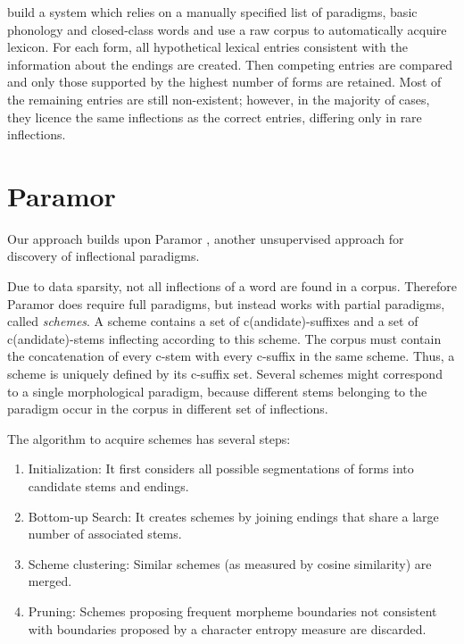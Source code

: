 \documentclass[11pt]{article}
\begin{document}
\cite{hana-etal-2004-emnlp,feldman-hana-2010-rodopi}
build a system which relies on a manually specified list of paradigms, basic phonology and closed-class words and use a raw corpus to automatically acquire lexicon. For each form, all hypothetical lexical entries consistent with the information about the endings are created. Then competing entries are compared and only those supported by the highest number of forms are retained. Most of the remaining entries are still non-existent; however, in the majority of cases, they licence the same inflections as the correct entries, differing only in rare inflections.


\section{Paramor}
\label{sec:paramor}

Our approach builds upon Paramor \cite{monson09}, another unsupervised approach for discovery of inflectional paradigms.

Due to data sparsity, not all inflections of a word are found in a corpus. Therefore Paramor does require 
full paradigms, but instead works with partial paradigms, called \emph{schemes}. A scheme contains a set of c(andidate)-suffixes and a set of c(andidate)-stems inflecting according to this scheme. The corpus must contain the concatenation of every c-stem with every c-suffix in the same scheme. Thus, a scheme is uniquely defined by its c-suffix set. Several schemes might correspond to a single morphological paradigm, because different stems belonging to the paradigm occur in the corpus in different set of inflections.

The algorithm to acquire schemes has several steps:
\begin{enumerate}
\item Initialization: It first considers all possible segmentations of forms into candidate stems and endings.
\item Bottom-up Search: It creates schemes by joining endings that share a large number of associated stems.
\item Scheme clustering: Similar schemes (as measured by cosine similarity) are merged.
\item Pruning: Schemes proposing frequent morpheme boundaries not consistent with boundaries proposed by a character entropy measure are discarded.
\end{enumerate}
\end{document}
